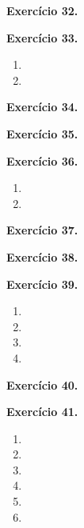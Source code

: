 \documentclass[12pt,a4paper]{article}
\begin{document}
\vspace{0.5cm}
\noindent\textbf{Exercício 32.}

\vspace{0.5cm}
\noindent\textbf{Exercício 33.}
\begin{enumerate}
    \renewcommand{\theenumi}{\alph{enumi}}
    \renewcommand{\labelenumi}{\theenumi)}
    \item 
    \item 
\end{enumerate}

\vspace{0.5cm}
\noindent\textbf{Exercício 34.}

\vspace{0.5cm}
\noindent\textbf{Exercício 35.}

\vspace{0.5cm}
\noindent\textbf{Exercício 36.}
\begin{enumerate}
    \renewcommand{\theenumi}{\alph{enumi}}
    \renewcommand{\labelenumi}{\theenumi)}
    \item 
    \item 
\end{enumerate}

\vspace{0.5cm}
\noindent\textbf{Exercício 37.}

\vspace{0.5cm}
\noindent\textbf{Exercício 38.}

\vspace{0.5cm}
\noindent\textbf{Exercício 39.}
\begin{enumerate}
    \renewcommand{\theenumi}{\alph{enumi}}
    \renewcommand{\labelenumi}{\theenumi)}
    \item 
    \item 
    \item 
    \item 
\end{enumerate}

\vspace{0.5cm}
\noindent\textbf{Exercício 40.}

\vspace{0.5cm}
\noindent\textbf{Exercício 41.}
\begin{enumerate}
    \renewcommand{\theenumi}{\alph{enumi}}
    \renewcommand{\labelenumi}{\theenumi)}
    \item 
    \item 
    \item 
    \item 
    \item 
    \item 
\end{enumerate}
\end{document}

